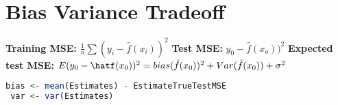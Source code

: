 \section{Bias Variance Tradeoff}
 \textbf{Training MSE:} $\frac{1}{n} \sum (y_i-\hat f(x_i))^2 $ \textbf{Test MSE:} $y_0 - \hat f(x_o))^2$ \textbf{Expected test MSE:} $E(y_0- \hatf(x_0))^2 = bias(\hat f(x_0))^2 + Var(\hat f(x_0)) + \sigma^2$
 \begin{lstlisting}[language=R]
 bias <- mean(Estimates) - EstimateTrueTestMSE 
 var <- var(Estimates)
 \end{lstlisting}
